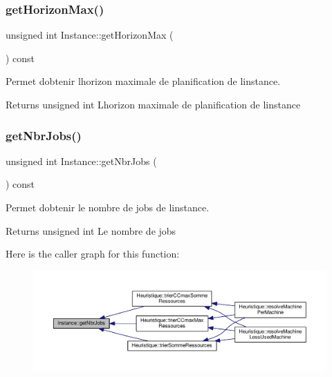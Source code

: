 \subsubsection{\texorpdfstring{get\+Horizon\+Max()}{getHorizonMax()}}
{\footnotesize\ttfamily unsigned int Instance\+::get\+Horizon\+Max (\begin{DoxyParamCaption}{ }\end{DoxyParamCaption}) const}



Permet d\textquotesingle{}obtenir l\textquotesingle{}horizon maximale de planification de l\textquotesingle{}instance. 

\begin{DoxyReturn}{Returns}
unsigned int L\textquotesingle{}horizon maximale de planification de l\textquotesingle{}instance 
\end{DoxyReturn}
\mbox{\label{classInstance_a1ed694b05c888cdb177ddf4c92a482d9}} 
\subsubsection{\texorpdfstring{get\+Nbr\+Jobs()}{getNbrJobs()}}
{\footnotesize\ttfamily unsigned int Instance\+::get\+Nbr\+Jobs (\begin{DoxyParamCaption}{ }\end{DoxyParamCaption}) const}



Permet d\textquotesingle{}obtenir le nombre de jobs de l\textquotesingle{}instance. 

\begin{DoxyReturn}{Returns}
unsigned int Le nombre de jobs 
\end{DoxyReturn}
Here is the caller graph for this function\+:\nopagebreak
\begin{figure}[H]
\begin{center}
\leavevmode
\includegraphics[width=350pt]{classInstance_a1ed694b05c888cdb177ddf4c92a482d9_icgraph}
\end{center}
\end{figure}
\mbox{\label{classInstance_a2f985b9a7ce18fd8739ec589d9016003}} 
